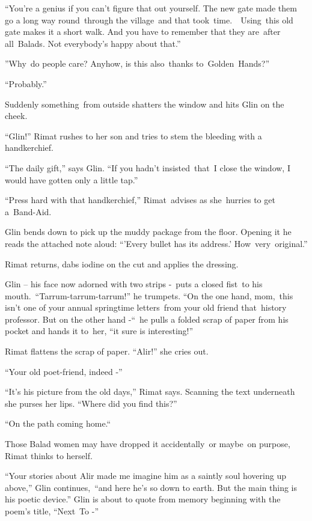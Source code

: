 \documentclass[twoside,11pt]{book}
\begin{document}
{}``You're a genius if you can't figure that out yourself. The new gate made them go a long way
{round\ through }the village\ and that took\ time.\ \ Using\ this old gate makes it a short walk. And
you have to remember that they are\ after all\ Balads. Not everybody{}'s happy about
that.''{\ }

{{}''Why\ do people care? Anyhow, is this
}also\ {thanks
to\ }Golden\ Hands{?''}

``Probably.''

Suddenly something~from outside shatters the window and hits Glin on
the cheek.

{}``Glin!'' Rimat rushes to her son and tries to stem the bleeding
with a handkerchief.\ 

{{}``The daily gift,'' says Glin. ``If you hadn't
insisted\ }that\ {I close the window, I would have gotten only a
}little tap{.'' }

{{}``Press hard with }that
handkerchief,{{}'' Rimat\ advises as she\ hurries to get
a}{\ }Band-Aid.

{Glin bends down to pick up the muddy
}package{ from the floor. Opening it he reads the attached note aloud:
``'Every bullet has its address.'
How\ }very{\ }{original.''}

{Rimat returns, dabs iodine on the cut and }applies the
dressing{. }

{Glin }{}-- his face now adorned with two strips
-{\ }{puts }a closed
fist\ {to his mouth.\ }{}``Tarrum-tarrum-tarrum!{}'' he trumpets. ``On
the one hand, mom,{\ this isn{}'t one of your annual springtime
letters\ from your old friend that}{\ }{history
professor. But on the other hand -``\ he pulls a folded scrap of paper from his pocket and hands it
to\ }her,{ ``it sure is interesting!{}'' }

Rimat flattens the scrap of paper. ``Alir!'' she cries out.

{}``Your old poet-friend, indeed -{}''

{}``It's his picture from the old days,{}'' Rimat says. Scanning the
text underneath she purses her lips. ``Where did you find this?{}''\ 

{}``On the path coming home.``\ 

Those Balad women may have dropped it accidentally\ or maybe\ on purpose, Rimat thinks to
herself{.\ }

``Your stories about Alir made me imagine him as a
saintly soul hovering up above,'' Glin continues,\ ``and here he's so down to earth. But the
main thing is his poetic device.'' Glin is about to quote from memory beginning with the poem's title, ``Next\ To {}-''
\end{document}
